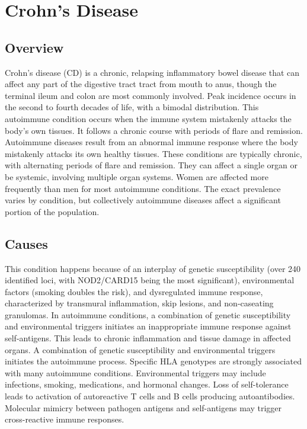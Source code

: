\chapter{Crohn's Disease}
\label{sec:Crohn's Disease}

\section{Overview}
Crohn's disease (CD) is a chronic, relapsing inflammatory bowel disease that can affect any part of the digestive tract tract from mouth to anus, though the terminal ileum and colon are most commonly involved. Peak incidence occurs in the second to fourth decades of life, with a bimodal distribution. This autoimmune condition occurs when the immune system mistakenly attacks the body's own tissues. It follows a chronic course with periods of flare and remission. Autoimmune diseases result from an abnormal immune response where the body mistakenly attacks its own healthy tissues. These conditions are typically chronic, with alternating periods of flare and remission. They can affect a single organ or be systemic, involving multiple organ systems. Women are affected more frequently than men for most autoimmune conditions. The exact prevalence varies by condition, but collectively autoimmune diseases affect a significant portion of the population.
\section{Causes}
This condition happens because of an interplay of genetic susceptibility (over 240 identified loci, with NOD2/CARD15 being the most significant), environmental factors (smoking doubles the risk), and dysregulated immune response, characterized by transmural inflammation, skip lesions, and non-caseating granulomas. In autoimmune conditions, a combination of genetic susceptibility and environmental triggers initiates an inappropriate immune response against self-antigens. This leads to chronic inflammation and tissue damage in affected organs. A combination of genetic susceptibility and environmental triggers initiates the autoimmune process. Specific HLA genotypes are strongly associated with many autoimmune conditions. Environmental triggers may include infections, smoking, medications, and hormonal changes. Loss of self-tolerance leads to activation of autoreactive T cells and B cells producing autoantibodies. Molecular mimicry between pathogen antigens and self-antigens may trigger cross-reactive immune responses.
